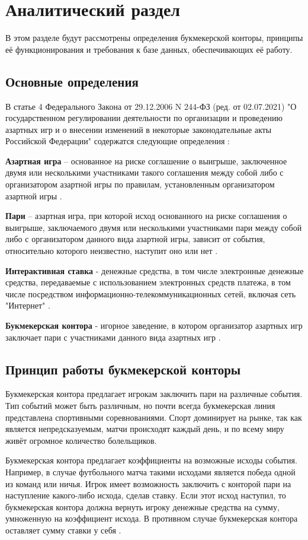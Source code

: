 \chapter{Аналитический раздел}
В этом разделе будут рассмотрены определения букмекерской конторы, принципы её функционирования и требования к базе данных, обеспечивающих её работу.

\section{Основные определения}
В статье 4 Федерального Закона от 29.12.2006 N 244-ФЗ (ред. от 02.07.2021) "О государственном регулировании деятельности по организации и проведению азартных игр и о внесении изменений в некоторые законодательные акты Российской Федерации" содержатся следующие определения \cite{bk}:

\textbf{Азартная игра} -- основанное на риске соглашение о выигрыше, заключенное двумя или несколькими участниками такого соглашения между собой либо с организатором азартной игры по правилам, установленным организатором азартной игры \cite{bk}.

\textbf{Пари} -- азартная игра, при которой исход основанного на риске соглашения о выигрыше, заключаемого двумя или несколькими участниками пари между собой либо с организатором данного вида азартной игры, зависит от события, относительно которого неизвестно, наступит оно или нет \cite{bk}.

\textbf{Интерактивная ставка} - денежные средства, в том числе электронные денежные средства, передаваемые с использованием электронных средств платежа, в том числе посредством информационно-телекоммуникационных сетей, включая сеть "Интернет" \cite{bk}.

\textbf{Букмекерская контора} - игорное заведение, в котором организатор азартных игр заключает пари с участниками данного вида азартных игр \cite{bk}.

\section{Принцип работы букмекерской конторы}
Букмекерская контора предлагает игрокам заключить пари на различные события. 
Тип событий может быть различным, но почти всегда букмекерская линия представлена спортивными соревнованиями.
Спорт доминирует на рынке, так как является непредсказуемым, матчи происходят каждый день, и по всему миру живёт огромное количество болельщиков.

Букмекерская контора предлагает коэффициенты на возможные исходы события. Например, в случае футбольного матча такими исходами является победа одной из команд или ничья. Игрок имеет возможность заключить с конторой пари на наступление какого-либо исхода, сделав ставку. Если этот исход наступил, то букмекерская контора должна вернуть игроку денежные средства на сумму, умноженную на коэффициент исхода. В противном случае букмекерская контора оставляет сумму ставки у себя \cite{kfs}.

